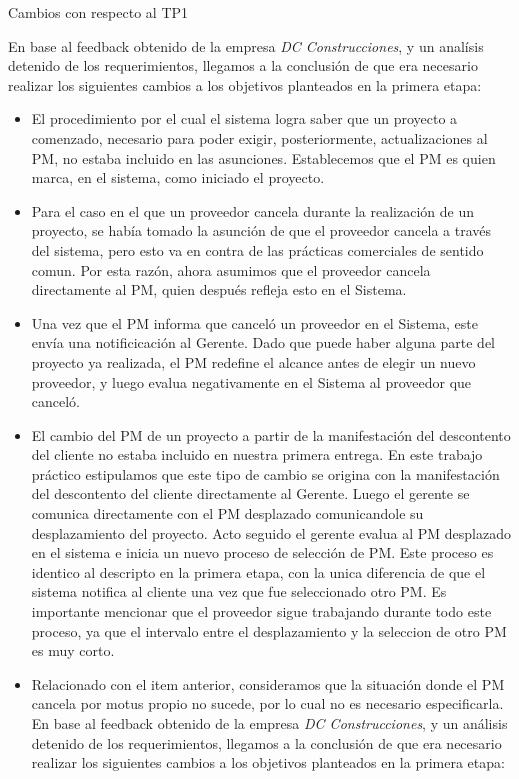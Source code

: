 Cambios con respecto al TP1


En base al feedback obtenido de la empresa \textit{DC Construcciones}, y un analísis detenido de los requerimientos, llegamos a la conclusión de que era necesario realizar los siguientes cambios a los objetivos planteados en la primera etapa:

\begin{itemize}
  \item El procedimiento por el cual el sistema logra saber que un proyecto a comenzado, necesario para poder exigir, posteriormente, actualizaciones al PM, no estaba incluido en las asunciones. Establecemos que el PM es quien marca, en el sistema, como iniciado el proyecto.
  \item Para el caso en el que un proveedor cancela durante la realización de un proyecto, se había tomado la asunción de que el proveedor cancela a través del sistema, pero esto va en contra de las prácticas comerciales de sentido comun. Por esta razón, ahora asumimos que el proveedor cancela directamente al PM, quien después refleja esto en el Sistema.
  \item Una vez que el PM informa que canceló un proveedor en el Sistema, este envía una notificicación al Gerente. Dado que puede haber alguna parte del proyecto ya realizada, el PM redefine el alcance antes de elegir un nuevo proveedor, y luego evalua negativamente en el Sistema al proveedor que canceló.
  \item El cambio del PM de un proyecto a partir de la manifestación del descontento del cliente no estaba incluido en nuestra primera entrega. En este trabajo práctico estipulamos que este tipo de cambio se origina con la manifestación del descontento del cliente directamente al Gerente. Luego el gerente se comunica directamente con el PM desplazado comunicandole su desplazamiento del proyecto. Acto seguido el gerente evalua al PM desplazado en el sistema e inicia un nuevo proceso de selección de PM. Este proceso es identico al descripto en la primera etapa, con la unica diferencia de que el sistema notifica al cliente una vez que fue seleccionado otro PM. Es importante mencionar que el proveedor sigue trabajando durante todo este proceso, ya que el intervalo entre el desplazamiento y la seleccion de otro PM es muy corto.
  \item Relacionado con el item anterior, consideramos que la situación donde el PM cancela por motus propio no sucede, por lo cual no es necesario especificarla.  
En base al feedback obtenido de la empresa \textit{DC Construcciones}, y un análisis detenido de los requerimientos, llegamos a la conclusión de que era necesario realizar los siguientes cambios a los objetivos planteados en la primera etapa:


\end{itemize}
